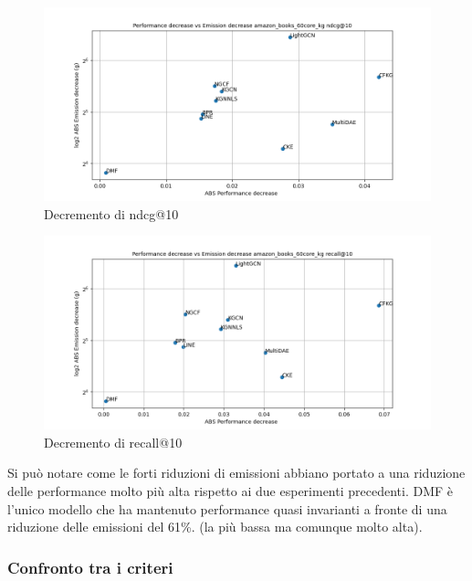 \begin{figure}[H]
    \centering
     \includegraphics[width=\textwidth]{images/decrement_ndcg@10_amazon_books_60core_kg.png}
    \caption{Decremento di ndcg@10}
\end{figure}

\begin{figure}[H]
    \centering
     \includegraphics[width=\textwidth]{images/decrement_recall@10_amazon_books_60core_kg.png}
    \caption{Decremento di recall@10}
\end{figure}
\noindent Si può notare come le forti riduzioni di emissioni abbiano portato a una riduzione delle performance molto più alta rispetto ai due esperimenti precedenti.
DMF è l'unico modello che ha mantenuto performance quasi invarianti a fronte di una riduzione delle emissioni del 61\%. (la più bassa ma comunque molto alta).




\subsubsection{Confronto tra i criteri}

